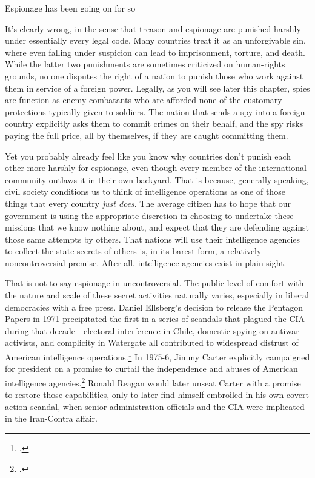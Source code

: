 \documentclass{memoir}
\begin{document}
\begin{refsegment}
Espionage has been going on for so

It's clearly wrong, in the sense that treason and espionage are punished harshly under essentially every legal code. Many countries treat it as an unforgivable sin, where even falling under suspicion can lead to imprisonment, torture, and death. While the latter two punishments are sometimes criticized on human-rights grounds, no one disputes the right of a nation to punish those who work against them in service of a foreign power. Legally, as you will see later this chapter, spies are function as enemy combatants who are afforded none of the customary protections typically given to soldiers. The nation that sends a spy into a foreign country explicitly asks them to commit crimes on their behalf, and the spy risks paying the full price, all by themselves, if they are caught committing them.

Yet you probably already feel like you know why countries don't punish each other more harshly for espionage, even though every member of the international community outlaws it in their own backyard. That is because, generally speaking, civil society conditions us to think of intelligence operations as one of those things that every country \emph{just does}. The average citizen has to hope that our government is using the appropriate discretion in choosing to undertake these missions that we know nothing about, and expect that they are defending against those same attempts by others. That nations will use their intelligence agencies to collect the state secrets of others is, in its barest form, a relatively noncontroversial premise. After all, intelligence agencies exist in plain sight.

That is not to say espionage in uncontroversial. The public level of comfort with the nature and scale of these secret activities naturally varies, especially in liberal democracies with a free press. Daniel Ellsberg's decision to release the Pentagon Papers in 1971 precipitated the first in a series of scandals that plagued the CIA during that decade---electoral interference in Chile, domestic spying on antiwar activists, and complicity in Watergate all contributed to widespread distrust of American intelligence operations.\footcite[p.~214-215]{andrew_missing_1984} In 1975-6, Jimmy Carter explicitly campaigned for president on a promise to curtail the independence and abuses of American intelligence agencies.\footcite[p.~217]{andrew_missing_1984} Ronald Reagan would later unseat Carter with a promise to restore those capabilities, only to later find himself embroiled in his own covert action scandal, when senior administration officials and the CIA were implicated in the Iran-Contra affair.


\end{refsegment}
\end{document}
